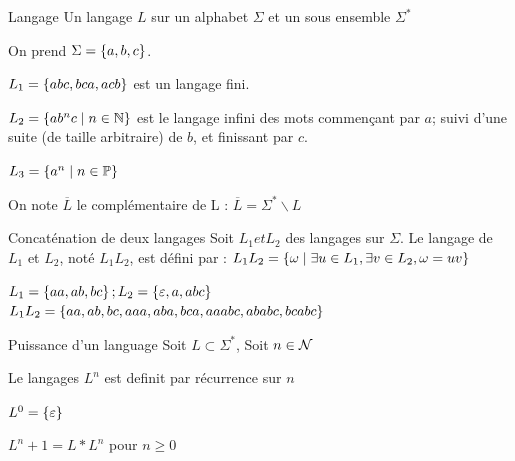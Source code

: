 \documentclass[a4paper,french,bookmarks]{book}
\begin{document}
    \begin{definition}{Langage}{}
        Un langage $L$ sur un alphabet $\Sigma$ et un sous ensemble $\Sigma^*$ 
    \end{definition}
    
    \begin{example}{}{}
        On prend $\Sigma = \left\{a, b, c\right\}$.
        \begin{enumerate}
            \itt $L_1 = \left\{abc, bca, acb\right\}$ est un langage fini.
            
            \itt $L_2 = \left\{ab^nc \;\middle\vert\; n \in \mathbb{N}\right\}$ est le langage infini des mots commençant par $a$; suivi d'une suite (de taille arbitraire) de $b$, et finissant par $c$.
            
            \itt $L_3 = \left\{a^n \;\middle\vert\; n \in \mathbb{P}\right\}$
        \end{enumerate}
    \end{example}
    
    \begin{notation}
        On note $\overline{L}$ le complémentaire de L :
        $\overline{L} = \Sigma^* \backslash L$
    \end{notation}
    
    \begin{definition}{Concaténation de deux langages}{}
        Soit $L_1 et L_2$ des langages sur $\Sigma$.
        Le langage   de $L_1$ et $L_2$, noté $L_1 L_2$, est défini par :
        $L_1 L_2 = \left\{\omega \;\middle\vert\; \exists u \in L_1, \exists v \in L_2, \omega = uv\right\}$
    \end{definition}
    
    \begin{example}{}{}
        $L_1 = \left\{aa, ab, bc\right\} ; L_2 = \left\{\varepsilon, a, abc\right\}$
        $L_1 L_2 = \left\{aa, ab, bc, aaa, aba, bca, aaabc, ababc, bcabc\right\}$
    \end{example}
    
    \begin{definition}{Puissance d'un language }
        Soit $L \subset \Sigma^*$, Soit $n\in \mathcal{N}$  
        
        
        Le langages $L^n$ est definit par récurrence sur $n$
        \begin{enumerate}{}{}
            
            \itt $L^0 = \left\{ \varepsilon\right\}$
            
            \itt %
                $L^n+1 = L * L^n $ pour $n \geq 0$ 
                
        \end{enumerate}{}
        
    \end{definition}
    
\end{document}
